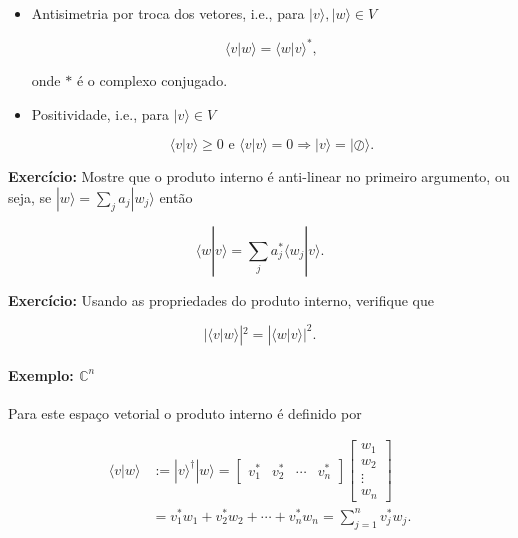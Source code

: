 \documentclass[11pt]{article}
\providecommand{\tightlist}{%
      \setlength{\itemsep}{0pt}\setlength{\parskip}{0pt}}
\begin{document}
\begin{itemize}
\tightlist
\item
  Antisimetria por troca dos vetores, i.e., para
  \(|v\rangle,|w\rangle\in V\)

  \begin{equation}
  \langle v|w\rangle = \langle w|v\rangle^{*},
  \end{equation}

  onde \(*\) é o complexo conjugado.
\item
  Positividade, i.e., para \(|v\rangle\in V\)

  \begin{equation}
  \langle v|v\rangle\ge 0\text{ e }\langle v|v\rangle=0\Rightarrow |v\rangle=|\oslash\rangle.
  \end{equation}
\end{itemize}

\textbf{Exercício:} Mostre que o produto interno é anti-linear no
primeiro argumento, ou seja, se \(|w\rangle=\sum_{j}a_{j}|w_{j}\rangle\)
então

\begin{equation}
\langle w|v\rangle = \sum_{j}a_{j}^{*}\langle w_{j}|v\rangle.
\end{equation}

\textbf{Exercício:} Usando as propriedades do produto interno, verifique
que

\begin{equation}
|\langle v|w\rangle|^{2}=|\langle w|v\rangle|^{2}.
\end{equation}

    \paragraph{\texorpdfstring{Exemplo:
\(\mathbb{C}^{n}\)}{Exemplo: \textbackslash{}mathbb\{C\}\^{}\{n\}}}\label{exemplo-mathbbcn}

Para este espaço vetorial o produto interno é definido por

\begin{align}
\langle v|w\rangle & := |v\rangle^{\dagger}|w\rangle = \begin{bmatrix} v_{1}^{*} & v_{2}^{*} & \cdots & v_{n}^{*} \end{bmatrix}\begin{bmatrix} w_{1} \\ w_{2} \\ \vdots \\ w_{n} \end{bmatrix} \\
& = v_{1}^{*}w_{1}+v_{2}^{*}w_{2}+\cdots+v_{n}^{*}w_{n}= \sum_{j=1}^{n}v_{j}^{*}w_{j}.
\end{align}
\end{document}
